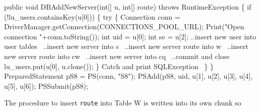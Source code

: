 \documentclass{article}
\def\nwendcode{\endtrivlist \endgroup}      %
\let\nwdocspar=\par
\theoremstyle{definition}                   %
\begin{document}
\nwenddocs{}\endmoddef{}
public void DBAddNewServer(int[] u, int[] route) throws RuntimeException \{
  if (!lu_users.containsKey(u[0])) \{
    try \{
      Connection conn = DriverManager.getConnection(CONNECTIONS_POOL_URL);
      Print("Open connection "+conn.toString());
      int uid = u[0];
      int se = u[2];
      \LA{}..insert new user into user tables~{\nwtagstyle{}}\RA{}
      \LA{}..insert new server into s~{\nwtagstyle{}}\RA{}
      \LA{}..insert new server route into w~{\nwtagstyle{}}\RA{}
      \LA{}..insert new server route into cw~{\nwtagstyle{}}\RA{}
      \LA{}..insert new server into cq~{\nwtagstyle{}}\RA{}
      \LA{}..commit and close~{\nwtagstyle{}}\RA{}
      lu_users.put(u[0], u.clone());
    \}
    \LA{}Catch and print \code{}SQLException\edoc{}~{\nwtagstyle{}}\RA{}
  \}
\}
\eatline
{}\nwendcode{}\endmoddef{}
PreparedStatement pS8 = PS(conn, "S8");
PSAdd(pS8, uid, u[1], u[2], u[3], u[4], u[5], u[6]);
PSSubmit(pS8);
\nwendcode{}\nwdocspar
The procedure to insert {\tt{}route} into Table W is written into its own chunk so
\end{document}
